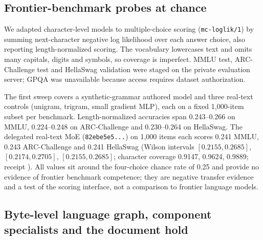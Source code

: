 \documentclass[11pt]{article}
\begin{document}
\subsection{Frontier-benchmark probes at chance}\label{sec:frontier}
We adapted character-level models to multiple-choice scoring (\texttt{mc-loglik/1}) by summing
next-character negative log likelihood over each answer choice, also reporting length-normalized
scoring. The vocabulary lowercases text and omits many capitals, digits and symbols, so coverage
is imperfect. MMLU test, ARC-Challenge test and HellaSwag validation were staged on the private
evaluation server; GPQA was unavailable because access requires dataset authorization.

The first sweep covers a synthetic-grammar authored model and three real-text controls
(unigram, trigram, small gradient MLP), each on a fixed 1{,}000-item subset per benchmark.
Length-normalized accuracies span 0.243--0.266 on MMLU, 0.224--0.248 on ARC-Challenge and
0.230--0.264 on HellaSwag. The delegated real-text MoE (\texttt{82ebe5e5...}) on 1{,}000 items
each scores 0.241 MMLU, 0.243 ARC-Challenge and 0.241 HellaSwag (Wilson intervals
$[0.2155,0.2685]$, $[0.2174,0.2705]$, $[0.2155,0.2685]$; character coverage 0.9147, 0.9624,
0.9889; receipt ). All values sit
around the four-choice chance rate of 0.25 and provide no evidence of frontier benchmark
competence; they are negative transfer evidence and a test of the scoring interface, not a
comparison to frontier language models.

\subsection{Byte-level language graph, component specialists and the document hold}\label{sec:components}
\end{document}
